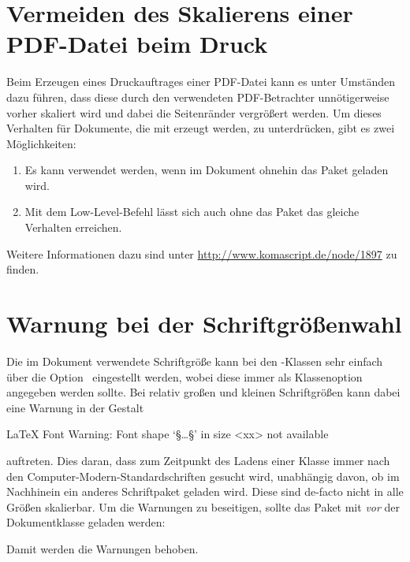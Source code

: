 \section{Vermeiden des Skalierens einer PDF-Datei beim Druck}
%
%
Beim Erzeugen eines Druckauftrages einer PDF-Datei kann es unter Umständen dazu 
führen, dass diese durch den verwendeten PDF-Betrachter unnötigerweise vorher 
skaliert wird und dabei die Seitenränder vergrößert werden. Um dieses Verhalten 
für Dokumente, die mit  erzeugt werden, zu unterdrücken, gibt es 
zwei Möglichkeiten:
%
\begin{enumerate}
\item Es kann  verwendet 
  werden, wenn im Dokument ohnehin das Paket  geladen wird.
\item Mit dem Low-Level-Befehl
  lässt sich auch ohne das Paket das gleiche Verhalten erreichen.
\end{enumerate}
%
Weitere Informationen dazu sind unter \url{http://www.komascript.de/node/1897} 
zu finden.


\section{Warnung bei der Schriftgrößenwahl}
%
%
Die im Dokument verwendete Schriftgröße kann bei den \KOMAScript-Klassen sehr 
einfach über die Option~ eingestellt werden, wobei diese immer 
als Klassenoption angegeben werden sollte. Bei relativ großen und kleinen 
Schriftgrößen kann dabei eine Warnung in der Gestalt 
%
\begin{quoting}
\begin{Code}[escapechar=§]
LaTeX Font Warning: Font shape `§\dots§' in size <xx> not available
\end{Code}
\end{quoting}
%
auftreten. Dies daran, dass zum Zeitpunkt des Ladens einer Klasse immer nach 
den Computer-Modern-Standardschriften gesucht wird, unabhängig davon, ob im 
Nachhinein ein anderes Schriftpaket geladen wird. Diese sind de-facto nicht in 
alle Größen skalierbar. Um die Warnungen zu beseitigen, sollte das Paket 
 mit  \emph{vor} der Dokumentklasse 
geladen werden: 
\begin{quoting}[rightmargin=0pt]
\end{quoting}
%
Damit werden die Warnungen behoben.



